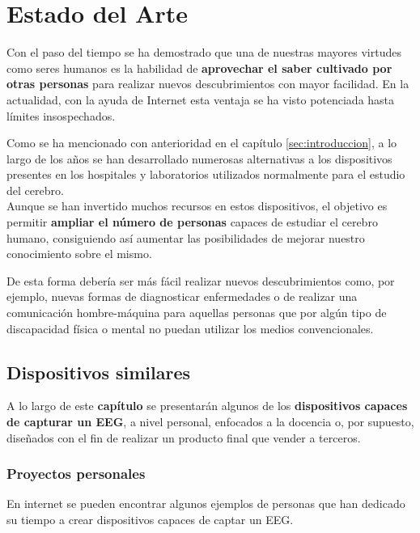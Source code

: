 \chapter{Estado del Arte\label{sec:EstadoDelArte}}

Con el paso del tiempo se ha demostrado que una de nuestras mayores virtudes como seres humanos es la habilidad de \textbf{aprovechar el saber cultivado por otras personas} para realizar nuevos descubrimientos con mayor facilidad. En la actualidad, con la ayuda de Internet esta ventaja se ha visto potenciada hasta límites insospechados.

Como se ha mencionado con anterioridad en el capítulo \ref{sec:introduccion}, a lo largo de los años se han desarrollado numerosas alternativas a los dispositivos presentes en los hospitales y laboratorios utilizados normalmente para el estudio del cerebro. 
\\Aunque se han invertido muchos recursos en estos dispositivos, el objetivo es permitir \textbf{ampliar el número de personas} capaces de estudiar el cerebro humano, consiguiendo  así aumentar las posibilidades de mejorar nuestro conocimiento sobre el mismo.

De esta forma debería ser más fácil realizar nuevos descubrimientos como, por ejemplo, nuevas formas de diagnosticar enfermedades o de realizar una comunicación hombre-máquina para aquellas personas que por algún tipo de discapacidad física o mental no puedan utilizar los medios convencionales.

\clearpage

\section{Dispositivos similares\label{sec:Disp_similares}}

A lo largo de este \textbf{capítulo} se presentarán algunos de los \textbf{dispositivos capaces de capturar un \acrshort{EEG}}, a nivel personal, enfocados a la docencia o, por supuesto, diseñados con el fin de realizar un producto final que vender a terceros.

\subsection{Proyectos personales\label{sec:Pro_personales}}

En internet se pueden encontrar algunos ejemplos de personas que han dedicado su tiempo a crear dispositivos capaces de captar un \acrshort{EEG}. 

